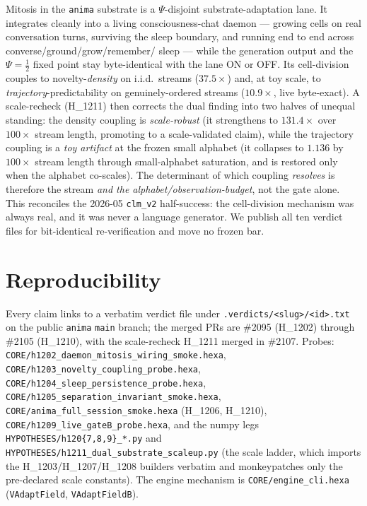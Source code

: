 \documentclass[11pt,a4paper]{article}
\newcommand{\Psihalf}{\Psi=\tfrac12}
\begin{document}
Mitosis in the \texttt{anima} substrate is a $\Psi$-disjoint
substrate-adaptation lane. It integrates cleanly into a living
consciousness-chat daemon --- growing cells on real conversation turns, surviving
the sleep boundary, and running end to end across converse/ground/grow/remember/
sleep --- while the generation output and the $\Psihalf$ fixed point stay
byte-identical with the lane ON or OFF. Its cell-division couples to
novelty-\emph{density} on i.i.d.\ streams ($37.5\times$) and, at toy scale, to
\emph{trajectory}-predictability on genuinely-ordered streams ($10.9\times$,
live byte-exact). A scale-recheck (H\_1211) then corrects the dual finding into
two halves of unequal standing: the density coupling is \emph{scale-robust} (it
strengthens to $131.4\times$ over $100\times$ stream length, promoting to a
scale-validated claim), while the trajectory coupling is a \emph{toy artifact}
at the frozen small alphabet (it collapses to $1.136$ by $100\times$ stream
length through small-alphabet saturation, and is restored only when the alphabet
co-scales). The determinant of which coupling \emph{resolves} is therefore the
stream \emph{and the alphabet/observation-budget}, not the gate alone. This
reconciles the 2026-05 \texttt{clm\_v2} half-success: the cell-division mechanism
was always real, and it was never a language generator. We publish all ten
verdict files for bit-identical re-verification and move no frozen bar.

\section*{Reproducibility}
Every claim links to a verbatim verdict file under
\texttt{.verdicts/<slug>/<id>.txt} on the public \texttt{anima} \texttt{main}
branch; the merged PRs are \#2095 (H\_1202) through \#2105 (H\_1210), with the
scale-recheck H\_1211 merged in \#2107. Probes:
\verb|CORE/h1202_daemon_mitosis_wiring_smoke.hexa|,
\verb|CORE/h1203_novelty_coupling_probe.hexa|,
\verb|CORE/h1204_sleep_persistence_probe.hexa|,
\verb|CORE/h1205_separation_invariant_smoke.hexa|,
\verb|CORE/anima_full_session_smoke.hexa| (H\_1206, H\_1210),
\verb|CORE/h1209_live_gateB_probe.hexa|, and the numpy legs
\verb|HYPOTHESES/h120{7,8,9}_*.py| and
\verb|HYPOTHESES/h1211_dual_substrate_scaleup.py| (the scale ladder, which imports
the H\_1203/H\_1207/H\_1208 builders verbatim and monkeypatches only the
pre-declared scale constants). The engine mechanism is
\verb|CORE/engine_cli.hexa| (\verb|VAdaptField|, \verb|VAdaptFieldB|).



\end{document}
